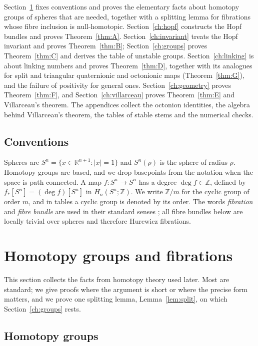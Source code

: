 \documentclass[11pt]{amsart}
\numberwithin{equation}{section}
\theoremstyle{plain}
\theoremstyle{definition}
\theoremstyle{remark}
\newcommand{\R}{\mathbb{R}}
\newcommand{\Z}{\mathbb{Z}}
\begin{document}
Section~\ref{ch:foundations} fixes conventions and proves the elementary facts about homotopy groups of spheres that are needed, together with a splitting lemma for fibrations whose fibre inclusion is null-homotopic. Section~\ref{ch:hopf} constructs the Hopf bundles and proves Theorem~\ref{thm:A}. Section~\ref{ch:invariant} treats the Hopf invariant and proves Theorem~\ref{thm:B}; Section~\ref{ch:groups} proves Theorem~\ref{thm:C} and derives the table of unstable groups. Section~\ref{ch:linking} is about linking numbers and proves Theorem~\ref{thm:D}, together with its analogues for split and triangular quaternionic and octonionic maps (Theorem~\ref{thm:G}), and the failure of positivity for general ones. Section~\ref{ch:geometry} proves Theorem~\ref{thm:F}, and Section~\ref{ch:villarceau} proves Theorem~\ref{thm:E} and Villarceau's theorem. The appendices collect the octonion identities, the algebra behind Villarceau's theorem, the tables of stable stems and the numerical checks.

\subsection{Conventions}

Spheres are $S^n=\{x\in\R^{n+1}:|x|=1\}$ and $S^n(\rho)$ is the sphere of radius $\rho$. Homotopy groups are based, and we drop basepoints from the notation when the space is path connected. A map $f\colon S^n\to S^n$ has a degree $\deg f\in\Z$, defined by $f_*[S^n]=(\deg f)[S^n]$ in $H_n(S^n;\Z)$. We write $\Z/m$ for the cyclic group of order $m$, and in tables a cyclic group is denoted by its order. The words \emph{fibration} and \emph{fibre bundle} are used in their standard senses \cite[Section~4.2]{Hat02}; all fibre bundles below are locally trivial over spheres and therefore Hurewicz fibrations.
\section{Homotopy groups and fibrations}\label{ch:foundations}

This section collects the facts from homotopy theory used later. Most are standard; we give proofs where the argument is short or where the precise form matters, and we prove one splitting lemma, Lemma~\ref{lem:split}, on which Section~\ref{ch:groups} rests.

\subsection{Homotopy groups}
\end{document}
